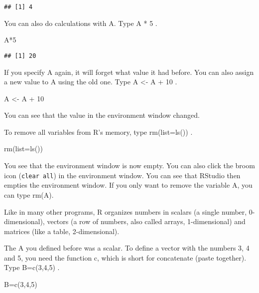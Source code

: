 \documentclass[
]{article}
\newenvironment{Shaded}{\begin{snugshade}}{\end{snugshade}}
\newcommand{\AttributeTok}[1]{\textcolor[rgb]{0.77,0.63,0.00}{#1}}
\newcommand{\DecValTok}[1]{\textcolor[rgb]{0.00,0.00,0.81}{#1}}
\newcommand{\FunctionTok}[1]{\textcolor[rgb]{0.00,0.00,0.00}{#1}}
\newcommand{\NormalTok}[1]{#1}
\newcommand{\OtherTok}[1]{\textcolor[rgb]{0.56,0.35,0.01}{#1}}
\newcommand{\SpecialCharTok}[1]{\textcolor[rgb]{0.00,0.00,0.00}{#1}}
\begin{document}
\begin{verbatim}
## [1] 4
\end{verbatim}

You can also do calculations with A. Type A * 5 .

\begin{Shaded}
\begin{Highlighting}[]
\NormalTok{A}\SpecialCharTok{*}\DecValTok{5}
\end{Highlighting}
\end{Shaded}

\begin{verbatim}
## [1] 20
\end{verbatim}

If you specify A again, it will forget what value it had before. You can
also assign a new value to A using the old one. Type A \textless- A + 10
.

\begin{Shaded}
\begin{Highlighting}[]
\NormalTok{A }\OtherTok{\textless{}{-}}\NormalTok{ A }\SpecialCharTok{+} \DecValTok{10}
\end{Highlighting}
\end{Shaded}

You can see that the value in the environment window changed.

To remove all variables from R's memory, type rm(list=ls()) .

\begin{Shaded}
\begin{Highlighting}[]
\FunctionTok{rm}\NormalTok{(}\AttributeTok{list=}\FunctionTok{ls}\NormalTok{())}
\end{Highlighting}
\end{Shaded}

You see that the environment window is now empty. You can also click the
broom icon (\texttt{clear\ all}) in the environment window. You can see
that RStudio then empties the environment window. If you only want to
remove the variable A, you can type rm(A).

Like in many other programs, R organizes numbers in scalars (a single
number, 0-dimensional), vectors (a row of numbers, also called arrays,
1-dimensional) and matrices (like a table, 2-dimensional).

The A you defined before was a scalar. To define a vector with the
numbers 3, 4 and 5, you need the function c, which is short for
concatenate (paste together). Type B=c(3,4,5) .

\begin{Shaded}
\begin{Highlighting}[]
\NormalTok{B}\OtherTok{=}\FunctionTok{c}\NormalTok{(}\DecValTok{3}\NormalTok{,}\DecValTok{4}\NormalTok{,}\DecValTok{5}\NormalTok{)}
\end{Highlighting}
\end{Shaded}
\end{document}
